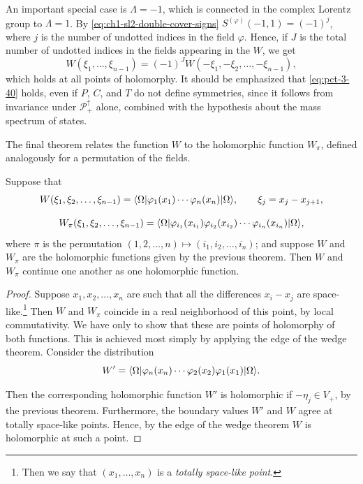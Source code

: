 An important special case is $\Lambda=-1$, which is connected in the complex
Lorentz group to $\Lambda=1$. By \eqref{eq:ch1-sl2-double-cover-signs}
$S^{(\varphi)}(-1,1)=(-1)^j$, where $j$ is the number of undotted indices in
the field $\varphi$. Hence, if $J$ is the total number of undotted indices
in the fields appearing in the $W$, we get
\begin{equation}
 W(\xi_1,\ldots,\xi_{n-1})
 =(-1)^J W(-\xi_1,-\xi_2,\ldots,-\xi_{n-1}),
 \tag{3-40}\label{eq:pct-3-40}
\end{equation}
which holds at all points of holomorphy. It should be emphasized that
\eqref{eq:pct-3-40} holds, even if $P$, $C$, and $T$ do not define symmetries, since it
follows from invariance under $\mathcal{P}^{\uparrow}_{+}$ alone, combined
with the hypothesis about the mass spectrum of states.

The final theorem relates the function $W$ to the holomorphic function
$W_\pi$, defined analogously for a permutation of the fields.

\begin{theorem}\label{thm:ch3-6-free-field-wightman-functions}
Suppose that
\begin{equation*}
 W(\xi_1,\xi_2,\ldots,\xi_{n-1})
 =\langle \Omega\rvert\varphi_1(x_1)\cdots\varphi_n(x_n)\lvert \Omega\rangle,
 \qquad \xi_j=x_j-x_{j+1},
\end{equation*}

\begin{equation*}
 W_\pi(\xi_1,\xi_2,\ldots,\xi_{n-1})
 =\langle \Omega\rvert\varphi_{i_1}(x_{i_1})\varphi_{i_2}(x_{i_2})\cdots
 \varphi_{i_n}(x_{i_n})\lvert \Omega\rangle,
\end{equation*}
where $\pi$ is the permutation
$(1,2,\ldots,n)\longmapsto(i_1,i_2,\ldots,i_n)$; and suppose $W$ and
$W_\pi$ are the holomorphic functions given by the previous theorem. Then
$W$ and $W_\pi$ continue one another as one holomorphic function.
\end{theorem}

\begin{proof}
Suppose $x_1,x_2,\ldots,x_n$ are such that all the differences $x_i-x_j$ are
space-like.\footnote{Then we say that $(x_1,\ldots,x_n)$ is a \emph{totally
space-like point}.} Then $W$ and $W_\pi$ coincide in a real neighborhood of
this point, by local commutativity. We have only to show that these are
points of holomorphy of both functions. This is achieved most simply by
applying the edge of the wedge theorem. Consider the distribution
\begin{equation*}
 W'=\langle \Omega\rvert\varphi_n(x_n)\cdots\varphi_2(x_2)
 \varphi_1(x_1)\lvert \Omega\rangle.
\end{equation*}

Then the corresponding holomorphic function $W'$ is holomorphic if
$-\eta_j\in V_+$, by the previous theorem. Furthermore, the boundary values
$W'$ and $W$ agree at totally space-like points. Hence, by the edge of the
wedge theorem $W$ is holomorphic at such a point.
\end{proof}

